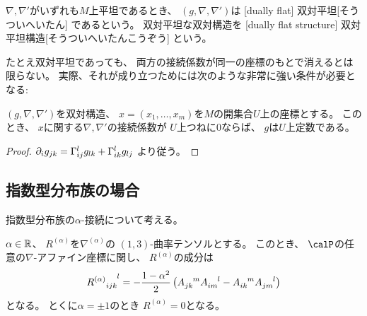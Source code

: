 \documentclass[report]{jlreq}
\begin{document}
\begin{definition}[双対平坦]
    $\nabla, \nabla'$がいずれも$M$上平坦であるとき、
    $(g, \nabla, \nabla')$は
    [dually flat]
        {双対平坦}[そうついへいたん]
    であるという。
    双対平坦な双対構造を
    [dually flat structure]
        {双対平坦構造}[そうついへいたんこうぞう]
    という。
\end{definition}

たとえ双対平坦であっても、
両方の接続係数が同一の座標のもとで消えるとは限らない。
実際、それが成り立つためには次のような非常に強い条件が必要となる:

\begin{proposition}
    $(g, \nabla, \nabla')$を双対構造、
    $x = (x_1, \dots, x_m)$を$M$の開集合$U$上の座標とする。
    このとき、
    $x$に関する$\nabla, \nabla'$の接続係数が
    $U$上つねに$0$ならば、
    $g$は$U$上定数である。
\end{proposition}

\begin{proof}
    $\partial_i g_{jk} = \Gamma_{ij}^l g_{lk} + \Gamma_{ik}^l g_{lj}$
    より従う。
\end{proof}

\subsection{指数型分布族の場合}

指数型分布族の$\alpha$-接続について考える。

\begin{proposition}[曲率のACテンソルによる表示]
    $\alpha \in \mathbb{R}$、
    $R^{(\alpha)}$を$\nabla^{(\alpha)}$の
    $(1, 3)$-曲率テンソルとする。
    このとき、
    $\calP$の任意の$\nabla$-アファイン座標に関し、
    $R^{(\alpha)}$の成分は
    \begin{equation}
        {R^{(\alpha)}}_{ijk}^{\hphantom{ijk}l}
            =
                - \frac{1 - \alpha^2}{2}
                \left({
                    A_{jk}^{\hphantom{jk}m} A_{im}^{\hphantom{im}l}
                    - A_{ik}^{\hphantom{ik}m} A_{jm}^{\hphantom{jm}l}
                }\right)
    \end{equation}
    となる。
    とくに$\alpha = \pm 1$のとき
    $R^{(\alpha)} = 0$となる。
\end{proposition}
\end{document}
